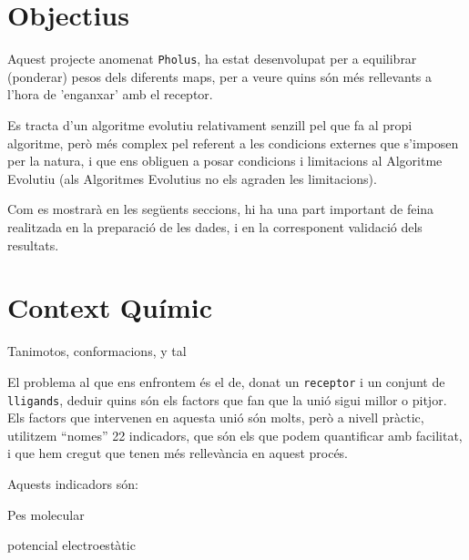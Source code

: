 \documentclass[titlepage,a4paper,12pt]{book}
\begin{document}
\section{Objectius} %
\label{sec:Objectius}
Aquest projecte anomenat \texttt{Pholus}, ha estat desenvolupat per a equilibrar (ponderar) pesos dels
diferents maps, per a veure quins són més rellevants a l'hora de 'enganxar' amb el receptor.  %

Es tracta d'un algoritme evolutiu relativament senzill pel que fa al propi algoritme, però més
complex pel referent a les condicions externes que s'imposen per la natura, i que ens obliguen a
posar condicions i limitacions al Algoritme Evolutiu (als Algoritmes Evolutius no els agraden les 
limitacions).

Com es mostrarà en les següents seccions, hi ha una part important de feina
realitzada en la preparació de les dades, i en la corresponent validació dels
resultats.



\section{Context Químic} %
\label{sec:Context Quimic}
Tanimotos, conformacions, y tal 

El problema al que ens enfrontem és el de, donat un \texttt{receptor} i un conjunt de %
\texttt{lligands}, deduir quins són els factors que fan que la unió sigui millor
o pitjor.  Els factors que intervenen en aquesta unió són molts, però a nivell
pràctic, utilitzem ``nomes'' 22 indicadors, que són els que podem quantificar
amb facilitat, i que hem cregut que tenen més rellevància en aquest procés.

Aquests indicadors són:

\begin{list}{Indicadors}{}
\item Pes molecular
\item potencial electroestàtic
\item 
\item 
\item 
\item 
\item 
\item 
\item 
\item 
\item 
\item 
\item 
\item 
\item 
\item 
\item 
\item 
\item 
\item 
\item 
\item 
\end{list}
\end{document}
